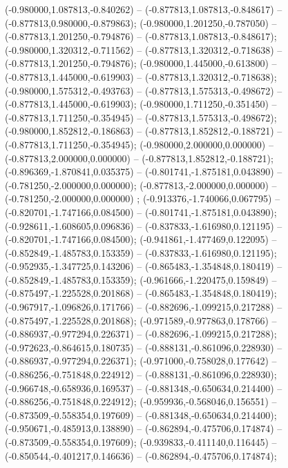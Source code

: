  (-0.980000,1.087813,-0.840262) -- (-0.877813,1.087813,-0.848617) -- (-0.877813,0.980000,-0.879863);
 (-0.980000,1.201250,-0.787050) -- (-0.877813,1.201250,-0.794876) -- (-0.877813,1.087813,-0.848617);
 (-0.980000,1.320312,-0.711562) -- (-0.877813,1.320312,-0.718638) -- (-0.877813,1.201250,-0.794876);
 (-0.980000,1.445000,-0.613800) -- (-0.877813,1.445000,-0.619903) -- (-0.877813,1.320312,-0.718638);
 (-0.980000,1.575312,-0.493763) -- (-0.877813,1.575313,-0.498672) -- (-0.877813,1.445000,-0.619903);
 (-0.980000,1.711250,-0.351450) -- (-0.877813,1.711250,-0.354945) -- (-0.877813,1.575313,-0.498672);
 (-0.980000,1.852812,-0.186863) -- (-0.877813,1.852812,-0.188721) -- (-0.877813,1.711250,-0.354945);
 (-0.980000,2.000000,0.000000) -- (-0.877813,2.000000,0.000000) -- (-0.877813,1.852812,-0.188721);
 (-0.896369,-1.870841,0.035375) -- (-0.801741,-1.875181,0.043890) -- (-0.781250,-2.000000,0.000000);
 (-0.877813,-2.000000,0.000000) -- (-0.781250,-2.000000,0.000000) ;
 (-0.913376,-1.740066,0.067795) -- (-0.820701,-1.747166,0.084500) -- (-0.801741,-1.875181,0.043890);
 (-0.928611,-1.608605,0.096836) -- (-0.837833,-1.616980,0.121195) -- (-0.820701,-1.747166,0.084500);
 (-0.941861,-1.477469,0.122095) -- (-0.852849,-1.485783,0.153359) -- (-0.837833,-1.616980,0.121195);
 (-0.952935,-1.347725,0.143206) -- (-0.865483,-1.354848,0.180419) -- (-0.852849,-1.485783,0.153359);
 (-0.961666,-1.220475,0.159849) -- (-0.875497,-1.225528,0.201868) -- (-0.865483,-1.354848,0.180419);
 (-0.967917,-1.096826,0.171766) -- (-0.882696,-1.099215,0.217288) -- (-0.875497,-1.225528,0.201868);
 (-0.971589,-0.977863,0.178766) -- (-0.886937,-0.977294,0.226371) -- (-0.882696,-1.099215,0.217288);
 (-0.972623,-0.864615,0.180735) -- (-0.888131,-0.861096,0.228930) -- (-0.886937,-0.977294,0.226371);
 (-0.971000,-0.758028,0.177642) -- (-0.886256,-0.751848,0.224912) -- (-0.888131,-0.861096,0.228930);
 (-0.966748,-0.658936,0.169537) -- (-0.881348,-0.650634,0.214400) -- (-0.886256,-0.751848,0.224912);
 (-0.959936,-0.568046,0.156551) -- (-0.873509,-0.558354,0.197609) -- (-0.881348,-0.650634,0.214400);
 (-0.950671,-0.485913,0.138890) -- (-0.862894,-0.475706,0.174874) -- (-0.873509,-0.558354,0.197609);
 (-0.939833,-0.411140,0.116445) -- (-0.850544,-0.401217,0.146636) -- (-0.862894,-0.475706,0.174874);
